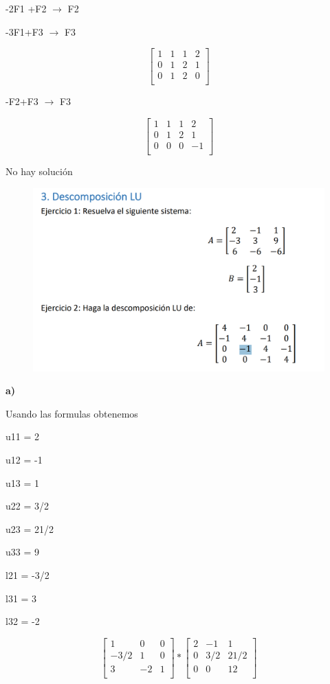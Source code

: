 \documentclass[12pt]{article}
\begin{document}
-2F1 +F2 $\longrightarrow $ F2

-3F1+F3 $\longrightarrow $ F3

\[
\begin{bmatrix}
1 & 1 & 1& 2\\
0 & 1 & 2& 1\\
0 & 1 & 2& 0\\
\end{bmatrix}
\]

-F2+F3 $\longrightarrow $ F3

\[
\begin{bmatrix}
1 & 1 & 1& 2\\
0 & 1 & 2& 1\\
0 & 0 & 0& -1\\
\end{bmatrix}
\]

No hay solución

\begin{figure}[H]
\includegraphics[width=1\textwidth]{./inFiles/Figures/Ej3.png}
\end{figure}


\textbf{a)}

Usando las formulas obtenemos

u11 = 2

u12 = -1

u13 = 1

u22 = 3/2

u23 = 21/2

u33  = 9

l21 = -3/2

l31 = 3

l32 = -2


\[
\begin{bmatrix}
1 & 0 & 0\\
-3/2 &  1& 0\\
3 & -2 & 1\\
\end{bmatrix}
*
\begin{bmatrix}
2 & -1 & 1\\
0 & 3/2 & 21/2\\
0 & 0 & 12\\
\end{bmatrix}
\]
\end{document}
